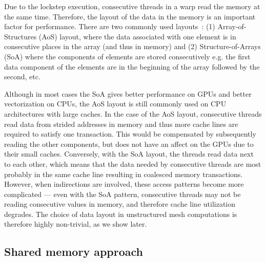 Due to the lockstep execution, consecutive threads in a warp read the memory at
the same time. Therefore, the layout of the data in the memory is an important
factor for performance. There are two commonly used
layouts~\cite{sharma2015data}: (1) Array-of-Structures (AoS) layout, where the
data associated with one element is in consecutive places in the array (and thus
in memory) and (2) Structure-of-Arrays (SoA) where the components of elements
are stored consecutively e.g. the first data component of the elements are in
the beginning of the array followed by the second, etc.

Although in most cases the SoA gives better performance on GPUs and better
vectorization on CPUs, the AoS layout is still commonly used on CPU
architectures with large caches. In the case of the AoS layout, consecutive
threads read data from strided addresses in memory and thus more cache lines 
are required to satisfy one transaction. This would be compensated by 
subsequently reading the other components, but does not have an affect on 
the GPUs due to their small caches. Conversely, with the SoA layout, the 
threads read data next to each other, which means that the data needed by 
consecutive threads are most probably in the same cache line resulting in 
coalesced memory transactions. However, when indirections are involved, these
access patterns become more complicated --- even with the SoA pattern,
consecutive threads may not be reading consecutive values in memory, and
therefore cache line utilization degrades. The choice of data layout in
unstructured mesh computations is therefore highly non-trivial, as we show
later.


\subsection{Shared memory approach}\label{shared-memory-approach}

